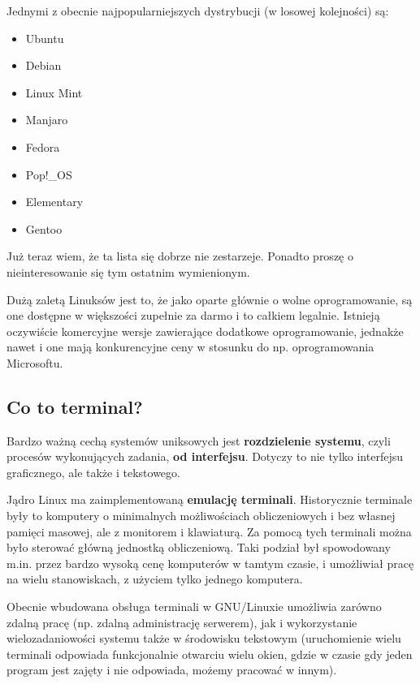 \documentclass[12pt]{article}
\begin{document}
Jednymi z obecnie najpopularniejszych dystrybucji (w losowej kolejności) są:

\begin{itemize}
    \item Ubuntu
    \item Debian
    \item Linux Mint
    \item Manjaro
    \item Fedora
    \item Pop!\_OS
    \item Elementary
    \item Gentoo
\end{itemize}

Już teraz wiem, że ta lista się dobrze nie zestarzeje. Ponadto proszę o nieinteresowanie się tym ostatnim wymienionym.

Dużą zaletą Linuksów jest to, że jako oparte głównie o wolne oprogramowanie, są one dostępne w większości zupełnie za darmo i to całkiem legalnie. Istnieją oczywiście komercyjne wersje zawierające dodatkowe oprogramowanie, jednakże nawet i one mają konkurencyjne ceny w stosunku do np. oprogramowania Microsoftu. 

\subsection{Co to terminal?}

Bardzo ważną cechą systemów uniksowych jest \textbf{rozdzielenie systemu}, czyli procesów wykonujących zadania, \textbf{od interfejsu}. Dotyczy to nie tylko interfejsu graficznego, ale także i tekstowego.

Jądro Linux ma zaimplementowaną \textbf{emulację terminali}. Historycznie terminale były to komputery o minimalnych możliwościach obliczeniowych i bez własnej pamięci masowej, ale z monitorem i klawiaturą. Za pomocą tych terminali można było sterować główną jednostką obliczeniową. Taki podział był spowodowany m.in. przez bardzo wysoką cenę komputerów w tamtym czasie, i umożliwiał pracę na wielu stanowiskach, z użyciem tylko jednego komputera.

Obecnie wbudowana obsługa terminali w GNU/Linuxie umożliwia zarówno zdalną pracę (np. zdalną administrację serwerem), jak i wykorzystanie wielozadaniowości systemu także w środowisku tekstowym (uruchomienie wielu terminali odpowiada funkcjonalnie otwarciu wielu okien, gdzie w czasie gdy jeden program jest zajęty i nie odpowiada, możemy pracować w innym).
\end{document}
